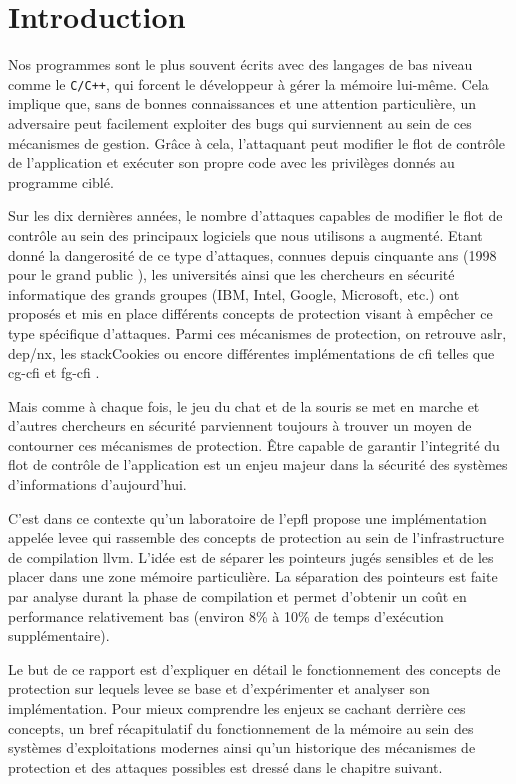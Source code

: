 \chapter{Introduction}
\label{chap:introduction}

Nos programmes sont le plus souvent écrits avec des langages de bas niveau comme le \texttt{C/C++}, qui forcent le développeur à gérer la mémoire lui-même. Cela implique que, sans de bonnes connaissances et une attention particulière, un adversaire peut facilement exploiter des bugs qui surviennent au sein de ces mécanismes de gestion. Grâce à cela, l’attaquant peut modifier le flot de contrôle de l'application et exécuter son propre code avec les privilèges donnés au programme ciblé.

Sur les dix dernières années, le nombre d'attaques capables de modifier le flot de contrôle au sein des principaux logiciels que nous utilisons a augmenté. Etant donné la dangerosité de ce type d’attaques, connues depuis cinquante ans (1998 pour le \og grand public \fg \cite{pharck49, SmashingTheStack}), les universités ainsi que les chercheurs en sécurité informatique des grands groupes (IBM, Intel, Google, Microsoft, etc.) ont proposés et mis en place différents concepts de protection visant à empêcher ce type spécifique d'attaques. Parmi ces mécanismes de protection, on retrouve \gls{aslr}, \gls{dep}/\gls{nx}, les \og \gls{stackCookies} \fg ou encore différentes implémentations de \og \gls{cfi} \fg telles que \og \gls{cg-cfi} \fg et \og \gls{fg-cfi} \fg.

Mais comme à chaque fois, le jeu du chat et de la souris se met en marche et d'autres chercheurs en sécurité parviennent toujours à trouver un moyen de contourner ces mécanismes de protection. Être capable de garantir l'integrité du flot de contrôle de l'application est un enjeu majeur dans la sécurité des systèmes d'informations d'aujourd'hui.

C'est dans ce contexte qu'un laboratoire de l’\gls{epfl} propose une implémentation appelée \gls{levee} qui rassemble des concepts de protection au sein de l’infrastructure de compilation \gls{llvm}. L’idée est de séparer les pointeurs jugés sensibles et de les placer dans une zone mémoire particulière. La séparation des pointeurs est faite par analyse durant la phase de compilation et permet d’obtenir un coût en performance relativement bas (environ 8\% à 10\% de temps d'exécution supplémentaire).

Le but de ce rapport est d’expliquer en détail le fonctionnement des concepts de protection sur lequels \gls{levee} se base et d’expérimenter et analyser son implémentation. Pour mieux comprendre les enjeux se cachant derrière ces concepts, un bref récapitulatif du fonctionnement de la mémoire au sein des systèmes d'exploitations modernes ainsi qu'un historique des mécanismes de protection et des attaques possibles est dressé dans le chapitre suivant.
